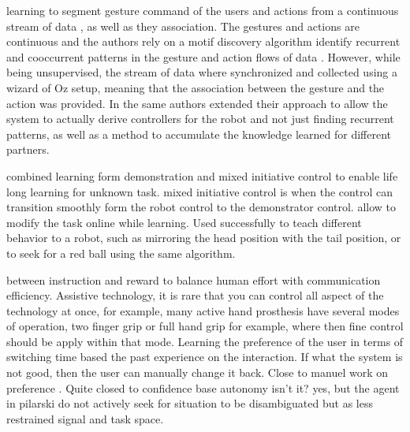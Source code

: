 \cite{mohammad2009unsupervised} learning to segment gesture command of the users and actions from a continuous stream of data , as well as they association. The gestures and actions are continuous and the authors rely on a motif discovery algorithm identify recurrent  and cooccurrent patterns in the gesture and action flows of data \cite{mohammad2009constrained}. However, while being unsupervised, the stream of data where synchronized and collected using a wizard of Oz setup, meaning that the association between the gesture and the action was provided. In \cite{mohammad2010learning} the same authors extended their approach to allow the system to actually derive controllers for the robot and not just finding recurrent patterns, as well as a method to accumulate the knowledge learned for different partners.


\cite{grollman2007dogged} combined learning form demonstration and mixed initiative control to enable life long learning for unknown task. mixed initiative control is when the control can transition smoothly form the robot control to the demonstrator control. allow to modify the task online while learning. Used successfully to teach different behavior to a robot, such as mirroring the head position with the tail position, or to seek for a red ball using the same algorithm.

\cite{pilarski2012between} between instruction and reward to balance human effort with communication efficiency. Assistive technology, it is rare that you can control all aspect of the technology at once, for example, many active hand prosthesis have several modes of operation, two finger grip or full hand grip for example, where then fine control should be apply within that mode. Learning the preference of the user in terms of switching time based the past experience on the interaction. If what the system is not good, then the user can manually change it back. Close to manuel work on preference \cite{Mason2011}. Quite closed to confidence base autonomy isn't it? \cite{chernova09jair} yes, but the agent in pilarski do not actively seek for situation to be disambiguated but as less restrained signal and task space.

